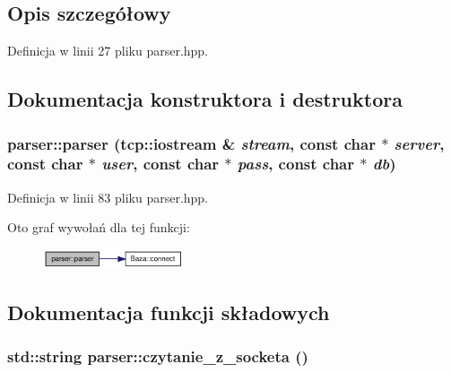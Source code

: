 \subsection{Opis szczegółowy}


Definicja w linii 27 pliku parser.hpp.

\subsection{Dokumentacja konstruktora i destruktora}
\hypertarget{a00005_3a237071a3ab764cd61bc53df9dd4f46}{
\subsubsection[{parser}]{\setlength{\rightskip}{0pt plus 5cm}parser::parser (tcp::iostream \& {\em stream}, \/  const char $\ast$ {\em server}, \/  const char $\ast$ {\em user}, \/  const char $\ast$ {\em pass}, \/  const char $\ast$ {\em db})}}
\label{dd/dad/a00005_3a237071a3ab764cd61bc53df9dd4f46}




Definicja w linii 83 pliku parser.hpp.

Oto graf wywołań dla tej funkcji:\nopagebreak
\begin{figure}[H]
\begin{center}
\leavevmode
\includegraphics[width=118pt]{dd/dad/a00005_3a237071a3ab764cd61bc53df9dd4f46_cgraph}
\end{center}
\end{figure}


\subsection{Dokumentacja funkcji składowych}
\hypertarget{a00005_272ecc740702b4f48efdb8469b414b24}{
\subsubsection[{czytanie\_\-z\_\-socketa}]{\setlength{\rightskip}{0pt plus 5cm}std::string parser::czytanie\_\-z\_\-socketa ()}}
\label{dd/dad/a00005_272ecc740702b4f48efdb8469b414b24}


